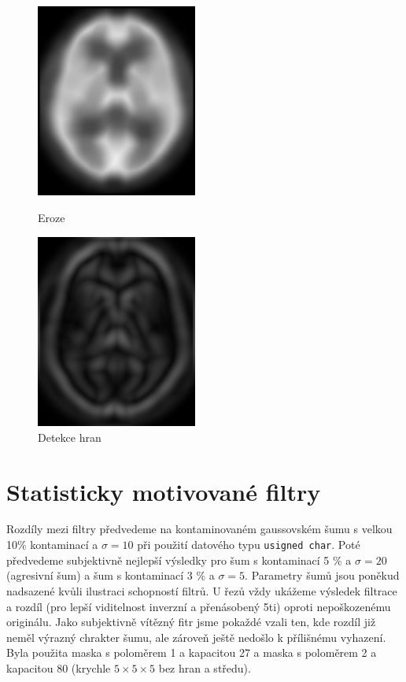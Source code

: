      \begin{figure}[h]
        \begin{minipage}[l]{0.5\textwidth}
            \center
            \includegraphics[width = 150pt]{src/8Appendix/final/eroze.png}
            \caption{Eroze}
        \end{minipage}
        \begin{minipage}[r]{0.5\textwidth}
            \center
            \includegraphics[width = 150pt]{src/8Appendix/final/hrany.png}
            \caption{Detekce hran}
        \end{minipage}
    \end{figure}


    \section{Statisticky motivované filtry}

    Rozdíly mezi filtry předvedeme na kontaminovaném gaussovském šumu s velkou 10\% kontaminací a $\sigma = 10$ při použití datového typu {\tt usigned char}. Poté předvedeme subjektivně nejlepší výsledky pro šum s kontaminací 5 \% a $\sigma = 20$ (agresivní šum) a šum s kontaminací 3 \% a $\sigma = 5$. Parametry šumů jsou poněkud nadsazené kvůli ilustraci schopností filtrů. U řezů vždy ukážeme výsledek filtrace a rozdíl (pro lepší viditelnost inverzní a přenásobený 5ti) oproti nepoškozenému originálu. Jako subjektivně vítězný fitr jsme pokaždé vzali ten, kde rozdíl již neměl výrazný chrakter šumu, ale zároveň ještě nedošlo k přílišnému vyhazení. Byla použita maska s poloměrem 1 a kapacitou 27 a maska s poloměrem 2 a kapacitou 80 (krychle $5\times 5\times 5$ bez hran a středu).
    
